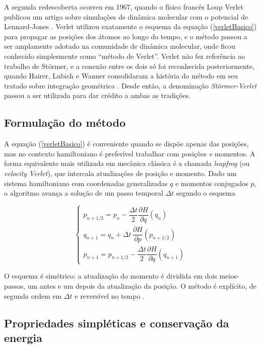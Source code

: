 \documentclass[twocolumn]{rbef}
\begin{document}
A segunda redescoberta ocorreu em 1967, quando o físico francês Loup Verlet publicou um artigo sobre simulações de dinâmica molecular com o potencial de Lennard-Jones \cite{Verlet}. Verlet utilizou exatamente o esquema da equação (\ref{verletBasico}) para propagar as posições dos átomos ao longo do tempo, e o método passou a ser amplamente adotado na comunidade de dinâmica molecular, onde ficou conhecido simplesmente como ``método de Verlet''. Verlet não fez referência ao trabalho de Störmer, e a conexão entre os dois só foi reconhecida posteriormente, quando Hairer, Lubich e Wanner consolidaram a história do método em seu tratado sobre integração geométrica \cite{stormer-verlet}. Desde então, a denominação \textit{Störmer-Verlet} passou a ser utilizada para dar crédito a ambas as tradições.

\subsection{Formulação do método}

A equação (\ref{verletBasico}) é conveniente quando se dispõe apenas das posições, mas no contexto hamiltoniano é preferível trabalhar com posições \textit{e} momentos. A forma equivalente mais utilizada em mecânica clássica é a chamada \textit{leapfrog} (ou \textit{velocity Verlet}), que intercala atualizações de posição e momento. Dado um sistema hamiltoniano com coordenadas generalizadas $q$ e momentos conjugados $p$, o algoritmo avança a solução de um passo temporal $\Delta t$ segundo o esquema

\begin{equation}\label{stormerVerlet}
    \begin{cases}
    p_{n+1/2} = p_n - \dfrac{\Delta t}{2}\dfrac{\partial H}{\partial q}(q_n)\\[8pt]
    q_{n+1} = q_n + \Delta t\,\dfrac{\partial H}{\partial p}(p_{n+1/2})\\[8pt]
    p_{n+1} = p_{n+1/2} - \dfrac{\Delta t}{2}\dfrac{\partial H}{\partial q}(q_{n+1})
    \end{cases}
\end{equation}

O esquema é simétrico: a atualização do momento é dividida em dois meios-passos, um antes e um depois da atualização da posição. O método é explícito, de segunda ordem em $\Delta t$ e reversível no tempo \cite{stormer-verlet}.

\subsection{Propriedades simpléticas e conservação da energia}\label{sec:simplectico}
\end{document}
